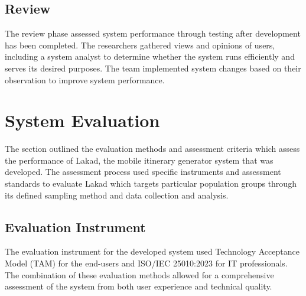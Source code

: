 \subsection{Review}
The review phase assessed system performance through testing after development has been completed. The researchers gathered views and opinions of users, including a system analyst to determine whether the system runs efficiently and serves its desired purposes. The team implemented system changes based on their observation to improve system performance.

\section{System Evaluation}

The section outlined the evaluation methods and assessment criteria which assess the performance of Lakad, the mobile itinerary generator system that was developed. The assessment process used specific instruments and assessment standards to evaluate Lakad which targets particular population groups through its defined sampling method and data collection and analysis.

\subsection{Evaluation Instrument}
The evaluation instrument for the developed system used Technology Acceptance Model (TAM) for the end-users and ISO/IEC 25010:2023 for IT professionals. The combination of these evaluation methods allowed for a comprehensive assessment of the system from both user experience and technical quality. 

